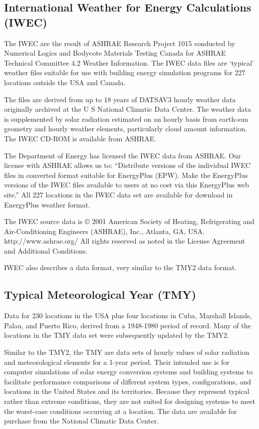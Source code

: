 \subsection{International Weather for Energy Calculations (IWEC)}\label{international-weather-for-energy-calculations-iwec}

The IWEC are the result of ASHRAE Research Project 1015 conducted by Numerical Logics and Bodycote Materials Testing Canada for ASHRAE Technical Committee 4.2 Weather Information. The IWEC data files are `typical' weather files suitable for use with building energy simulation programs for 227 locations outside the USA and Canada.

The files are derived from up to 18 years of DATSAV3 hourly weather data originally archived at the U S National Climatic Data Center. The weather data is supplemented by solar radiation estimated on an hourly basis from earth-sun geometry and hourly weather elements, particularly cloud amount information. The IWEC CD-ROM is available from ASHRAE.

The Department of Energy has licensed the IWEC data from ASHRAE. Our license with ASHRAE allows us to: ``Distribute versions of the individual IWEC files in converted format suitable for EnergyPlus (EPW). Make the EnergyPlus versions of the IWEC files available to users at no cost via this EnergyPlus web site.'' All 227 locations in the IWEC data set are available for download in EnergyPlus weather format.

The IWEC source data is © 2001 American Society of Heating, Refrigerating and Air-Conditioning Engineers (ASHRAE), Inc., Atlanta, GA, USA. http://www.ashrae.org/ All rights reserved as noted in the License Agreement and Additional Conditions.

IWEC also describes a data format, very similar to the TMY2 data format.

\subsection{Typical Meteorological Year (TMY)}\label{typical-meteorological-year-tmy}

Data for 230 locations in the USA plus four locations in Cuba, Marshall Islands, Palau, and Puerto Rico, derived from a 1948-1980 period of record. Many of the locations in the TMY data set were subsequently updated by the TMY2.

Similar to the TMY2, the TMY are data sets of hourly values of solar radiation and meteorological elements for a 1-year period. Their intended use is for computer simulations of solar energy conversion systems and building systems to facilitate performance comparisons of different system types, configurations, and locations in the United States and its territories. Because they represent typical rather than extreme conditions, they are not suited for designing systems to meet the worst-case conditions occurring at a location. The data are available for purchase from the National Climatic Data Center.

